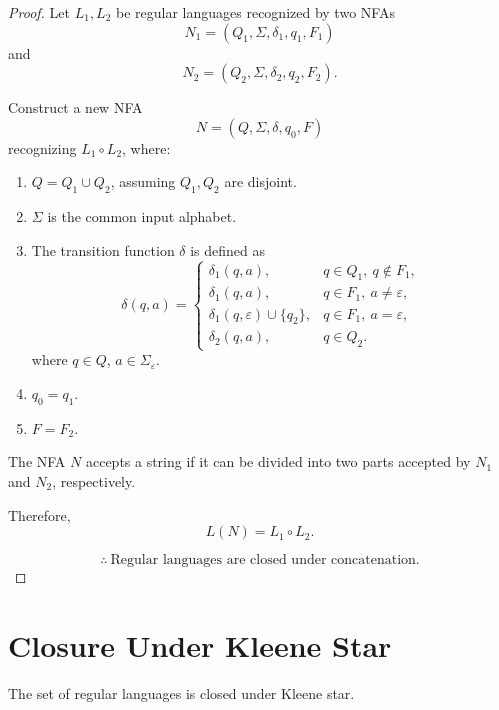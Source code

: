 \documentclass[11pt]{scrreprt}
\begin{document}
\begin{proof}
    Let $L_1, L_2$ be regular languages recognized by two NFAs
    \[
        N_1 = (Q_1, \Sigma, \delta_1, q_1, F_1)
    \]
    and
    \[
        N_2 = (Q_2, \Sigma, \delta_2, q_2, F_2).
    \]

    Construct a new NFA
    \[
        N = (Q, \Sigma, \delta, q_0, F)
    \]
    recognizing $L_1 \circ L_2$, where:

    \begin{enumerate}
        \item $Q = Q_1 \cup Q_2$, assuming $Q_1, Q_2$
        are disjoint.

        \item $\Sigma$ is the common input alphabet.

        \item The transition function $\delta$ is defined as
        \[
            \delta(q,a) =
            \begin{cases}
                \delta_1(q,a),
                & q \in Q_1,\ q \notin F_1,\\[4pt]
                \delta_1(q,a),
                & q \in F_1,\ a \neq \varepsilon,\\[4pt]
                \delta_1(q,\varepsilon) \cup \{q_2\},
                & q \in F_1,\ a = \varepsilon,\\[4pt]
                \delta_2(q,a),
                & q \in Q_2.
            \end{cases}
        \]
        where $q \in Q$, $a \in \Sigma_\varepsilon$.

        \item $q_0 = q_1$.

        \item $F = F_2$.
    \end{enumerate}

    The NFA $N$ accepts a string if it can be divided
    into two parts accepted by $N_1$ and $N_2$, respectively.

    Therefore,
    \[
        L(N) = L_1 \circ L_2.
    \]

    \[
        \boxed{
            \therefore\ \text{Regular languages are closed under concatenation.}
        }
    \]
\end{proof}

\section{Closure Under Kleene Star}
\begin{theorem*}
    The set of regular languages is closed under Kleene star.
\end{theorem*}
\end{document}
